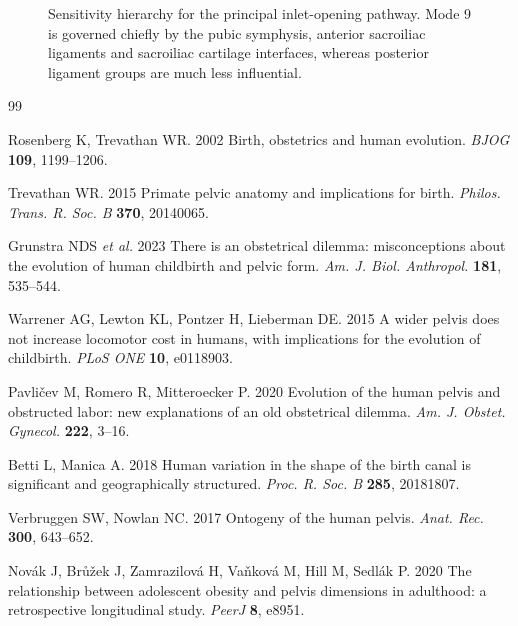 \documentclass[openacc]{rsproca_new}
\begin{document}
\begin{figure}[p]
\centering
{}
\caption{Sensitivity hierarchy for the principal inlet-opening pathway. Mode 9 is governed chiefly by the pubic symphysis, anterior sacroiliac ligaments and sacroiliac cartilage interfaces, whereas posterior ligament groups are much less influential.}
\label{fig:sensitivity}
\end{figure}

\clearpage

\begin{thebibliography}{99}

Rosenberg K, Trevathan WR. 2002 Birth, obstetrics and human evolution. \textit{BJOG} \textbf{109}, 1199--1206.

Trevathan WR. 2015 Primate pelvic anatomy and implications for birth. \textit{Philos. Trans. R. Soc. B} \textbf{370}, 20140065.

Grunstra NDS \textit{et al.} 2023 There is an obstetrical dilemma: misconceptions about the evolution of human childbirth and pelvic form. \textit{Am. J. Biol. Anthropol.} \textbf{181}, 535--544.

Warrener AG, Lewton KL, Pontzer H, Lieberman DE. 2015 A wider pelvis does not increase locomotor cost in humans, with implications for the evolution of childbirth. \textit{PLoS ONE} \textbf{10}, e0118903.

Pavli\v{c}ev M, Romero R, Mitteroecker P. 2020 Evolution of the human pelvis and obstructed labor: new explanations of an old obstetrical dilemma. \textit{Am. J. Obstet. Gynecol.} \textbf{222}, 3--16.

Betti L, Manica A. 2018 Human variation in the shape of the birth canal is significant and geographically structured. \textit{Proc. R. Soc. B} \textbf{285}, 20181807.

Verbruggen SW, Nowlan NC. 2017 Ontogeny of the human pelvis. \textit{Anat. Rec.} \textbf{300}, 643--652.

Nov\'{a}k J, Br\r{u}\v{z}ek J, Zamrazilov\'{a} H, Va\v{n}kov\'{a} M, Hill M, Sedl\'{a}k P. 2020 The relationship between adolescent obesity and pelvis dimensions in adulthood: a retrospective longitudinal study. \textit{PeerJ} \textbf{8}, e8951.


\end{thebibliography}
\end{document}
